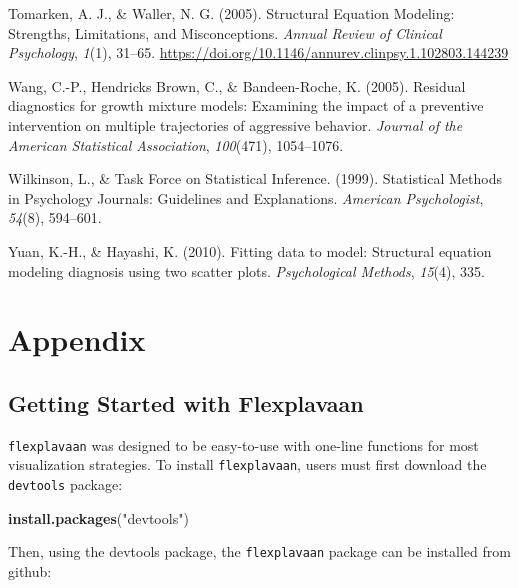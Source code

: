 \documentclass[
  english,
  man]{apa6}
\newenvironment{Shaded}{\begin{snugshade}}{\end{snugshade}}
\newcommand{\KeywordTok}[1]{\textcolor[rgb]{0.13,0.29,0.53}{\textbf{#1}}}
\newcommand{\NormalTok}[1]{#1}
\newcommand{\StringTok}[1]{\textcolor[rgb]{0.31,0.60,0.02}{#1}}
\newlength{\cslhangindent}
\newenvironment{cslreferences}%
  {\setlength{\parindent}{0pt}%
  \everypar{\setlength{\hangindent}{\cslhangindent}}\ignorespaces}%
  {\par}
\begin{document}
\begin{cslreferences}
\leavevmode\hypertarget{ref-Tomarken2005}{}%
Tomarken, A. J., \& Waller, N. G. (2005). Structural Equation Modeling: Strengths, Limitations, and Misconceptions. \emph{Annual Review of Clinical Psychology}, \emph{1}(1), 31--65. \url{https://doi.org/10.1146/annurev.clinpsy.1.102803.144239}

\leavevmode\hypertarget{ref-wang2005residual}{}%
Wang, C.-P., Hendricks Brown, C., \& Bandeen-Roche, K. (2005). Residual diagnostics for growth mixture models: Examining the impact of a preventive intervention on multiple trajectories of aggressive behavior. \emph{Journal of the American Statistical Association}, \emph{100}(471), 1054--1076.

\leavevmode\hypertarget{ref-Wilkinson1999a}{}%
Wilkinson, L., \& Task Force on Statistical Inference. (1999). Statistical Methods in Psychology Journals: Guidelines and Explanations. \emph{American Psychologist}, \emph{54}(8), 594--601.

\leavevmode\hypertarget{ref-yuan2010fitting}{}%
Yuan, K.-H., \& Hayashi, K. (2010). Fitting data to model: Structural equation modeling diagnosis using two scatter plots. \emph{Psychological Methods}, \emph{15}(4), 335.
\end{cslreferences}

\pagebreak

\hypertarget{appendix}{%
\section{Appendix}\label{appendix}}

\hypertarget{getting-started-with-flexplavaan}{%
\subsection{Getting Started with Flexplavaan}\label{getting-started-with-flexplavaan}}

\texttt{flexplavaan} was designed to be easy-to-use with one-line functions for most visualization strategies. To install \texttt{flexplavaan}, users must first download the \texttt{devtools} package:

\begin{Shaded}
\begin{Highlighting}[]
\KeywordTok{install.packages}\NormalTok{(}\StringTok{"devtools"}\NormalTok{)}
\end{Highlighting}
\end{Shaded}

Then, using the devtools package, the \texttt{flexplavaan} package can be installed from github:
\end{document}
